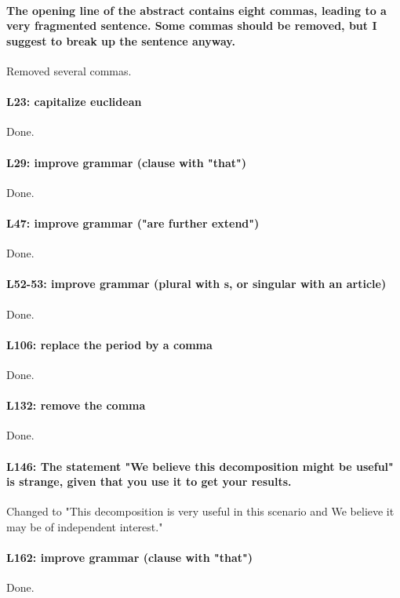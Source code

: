 


\paragraph{The opening line of the abstract contains eight commas, leading to a very fragmented sentence. Some commas should be removed, but I suggest to break up the sentence anyway.} Removed several commas.

\paragraph{L23: capitalize euclidean} Done.

\paragraph{L29: improve grammar (clause with "that")} Done.

\paragraph{L47: improve grammar ("are further extend")} Done.

\paragraph{L52-53: improve grammar (plural with s, or singular with an article)} Done.

\paragraph{L106: replace the period by a comma} Done.

\paragraph{L132: remove  the comma} Done.

\paragraph{L146: The statement "We believe this decomposition might be useful" is strange, given that you use it to get your results.} Changed to "This
decomposition is very useful in this scenario and We believe
it may be of independent interest."

\paragraph{L162: improve grammar (clause with "that")} Done.

